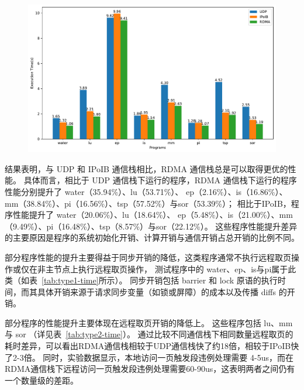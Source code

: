 {    \begin{figure}[!htbp]
        \centering
        \includegraphics[width=\linewidth]{Img/execution_time_comparison.pdf}
        \label{fig:time-comparison-diff-stacks}
    \end{figure}

    结果表明，与 UDP 和 IPoIB 通信栈相比，RDMA 通信栈总是可以取得更优的性能。
    具体而言，相比于 UDP 通信栈下运行的程序，RDMA 通信栈下运行的程序性能分别提升了 water（35.94\%）、lu（53.71\%）、
    ep（2.16\%）、is（16.86\%）、mm（38.84\%）、pi（16.56\%）、tsp（57.52\%）与sor（53.39\%）；
    相比于IPoIB，程序性能提升了  water（20.06\%）、lu（18.64\%）、
    ep（5.48\%）、is（21.00\%）、mm（9.49\%）、pi（16.48\%）、tsp（8.57\%）与sor（22.12\%）。
    这些程序性能提升差异的主要原因是程序的系统初始化开销、计算开销与通信开销占总开销的比例不同。

    部分程序性能的提升主要得益于同步开销的降低，这类程序通常不执行远程取页操作或仅在非主节点上执行远程取页操作，
    测试程序中的 water、ep、is与pi属于此类（如表~\ref{tab:type1-time}所示）。
    同步开销包括 barrier 和 lock 原语的执行时间，而其具体开销来源于请求同步变量（如锁或屏障）的成本以及传播 diffs 的开销。

    部分程序的性能提升主要体现在远程取页开销的降低上。
    这些程序包括 lu、mm 与 sor （详见表~\ref{tab:type2-time}）。
    通过比较不同通信栈下相同数量远程取页的耗时差异，可以看出RDMA通信栈相较于UDP通信栈快了约18倍，相较于IPoIB快了2-3倍。
    同时，实验数据显示，本地访问一页触发段违例处理需要 4-5us，而在RDMA通信栈下远程访问一页触发段违例处理需要60-90us，这表明两者之间仍有一个数量级的差距。

}
